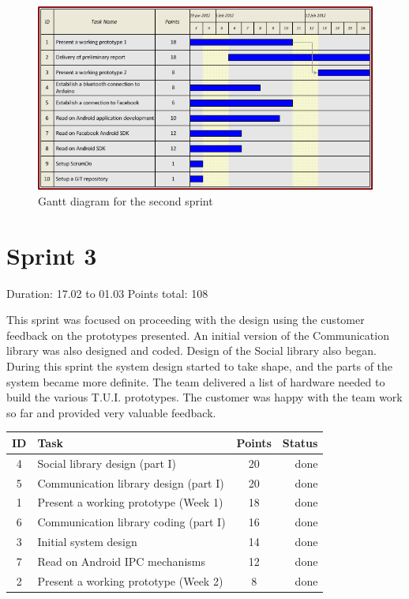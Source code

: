 \begin{figure}[h!]
\centering \includegraphics[scale=0.8]{img/sprints-gantt2.png}
\caption{Gantt diagram for the second sprint}
\label{fig:sprints-gantt2}
\end{figure}

\newpage

\section{Sprint 3}

Duration: 17.02 to 01.03
Points total: 108

This sprint was focused on proceeding with the design using the customer
feedback on the prototypes presented. An initial version of the Communication
library was also designed and coded. Design of the Social library also began.
During this sprint the system design started to take shape, and the parts
of the system became more definite. The team delivered a list of hardware needed
to build the various T.U.I. prototypes. The customer was happy with the team work
so far and provided very valuable feedback.

\begin{table}[ht!]
\begin{tabular}{ | c | l | c | r | }

\hline
\textbf{ID} & \textbf{Task} & \textbf{Points} & \textbf{Status} \\
\hline

 4 & Social library design (part I)					& 20 & done \\
\hline
 5 & Communication library design (part I)			& 20 & done \\
\hline
 1 & Present a working prototype (Week 1)			& 18 & done \\
\hline
 6 & Communication library coding (part I)			& 16 & done \\
\hline
 3 & Initial system design							& 14 & done \\
\hline
 7 & Read on Android IPC mechanisms					& 12 & done \\
\hline
 2 & Present a working prototype (Week 2)			& 8  & done \\
\hline

\end{tabular}
\end{table}

